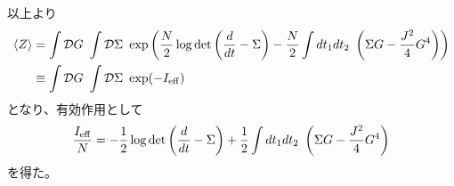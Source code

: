 \documentclass[a4]{ltjsarticle}
\newcommand{\deriv}{\frac{d}{dt}}
\newcommand{\pathint}[1]{\int \mathcal{D}#1 \ }
\newcommand{\average}[1]{\langle #1 \rangle}
\begin{document}
	以上より
	\begin{align}
	\average{Z} &= \pathint{G}\pathint{\Sigma}
		\exp\left(
		\frac{N}{2}\log\det\left(\deriv - \Sigma\right)
		- \frac{N}{2}\int dt_1dt_2\ \left(\Sigma G - \frac{J^2}{4}G^4\right)
		\right)\nonumber\\
	&\equiv \pathint{G}\pathint{\Sigma}\exp(-I_{\rm eff})
	\end{align}
	となり、有効作用として
	\begin{align}
	\frac{I_{\rm eff}}{N} = 
		- \frac{1}{2}\log\det\left(\deriv - \Sigma\right)
		+ \frac{1}{2}\int dt_1dt_2\ \left(\Sigma G - \frac{J^2}{4}G^4\right)
	\end{align}
	を得た。
\end{document}
